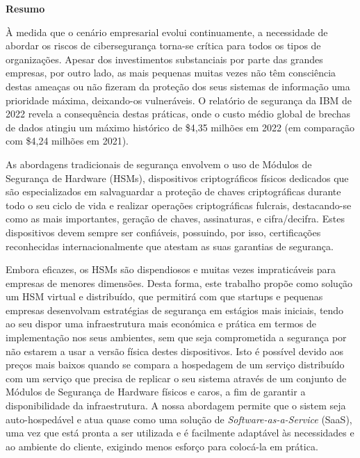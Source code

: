 
\vspace*{2cm}
\begin{center} \Large \bf Resumo
\end{center}
\vspace*{1cm} \setlength{\baselineskip}{0.6cm}




À medida que o cenário empresarial evolui continuamente, a necessidade de abordar os riscos de cibersegurança torna-se crítica para todos os tipos de organizações. Apesar dos investimentos substanciais por parte das grandes empresas, por outro lado, as mais pequenas muitas vezes não têm consciência destas ameaças ou não fizeram da proteção dos seus sistemas de informação uma prioridade máxima, deixando-os vulneráveis. O relatório de segurança da IBM de 2022 revela a consequência destas práticas, onde o custo médio global de brechas de dados atingiu um máximo histórico de \$4,35 milhões em 2022 (em comparação com \$4,24 milhões em 2021).

As abordagens tradicionais de segurança envolvem o uso de Módulos de Segurança de Hardware (HSMs), dispositivos criptográficos físicos dedicados que são especializados em salvaguardar a proteção de chaves criptográficas durante todo o seu ciclo de vida e realizar operações criptográficas fulcrais, destacando-se como as mais importantes, geração de chaves, assinaturas, e cifra/decifra. Estes dispositivos devem sempre ser confiáveis, possuindo, por isso, certificações reconhecidas internacionalmente que atestam as suas garantias de segurança.

Embora eficazes, os HSMs são dispendiosos e muitas vezes impraticáveis para empresas de menores dimensões. Desta forma, este trabalho propõe como solução um HSM virtual e distribuído, que permitirá com que startups e pequenas empresas desenvolvam estratégias de segurança em estágios mais iniciais, tendo ao seu dispor uma infraestrutura mais económica e prática em termos de implementação nos seus ambientes, sem que seja comprometida a segurança por não estarem a usar a versão física destes dispositivos. Isto é possível devido aos preços mais baixos quando se compara a hospedagem de um serviço distribuído com um serviço que precisa de replicar o seu sistema através de um conjunto de Módulos de Segurança de Hardware físicos e caros, a fim de garantir a disponibilidade da infraestrutura. A nossa abordagem permite que o sistem seja auto-hospedável e atua quase como uma solução de \textit{Software-as-a-Service} (SaaS), uma vez que está pronta a ser utilizada e é facilmente adaptável às necessidades e ao ambiente do cliente, exigindo menos esforço para colocá-la em prática.

